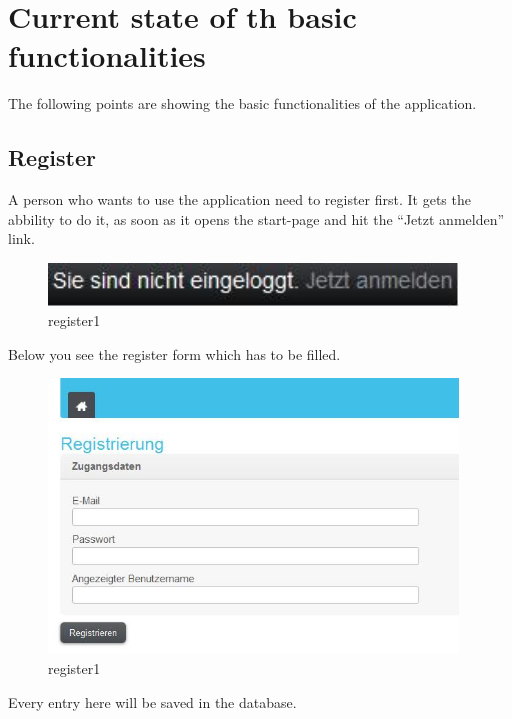 \section{Current state of th basic functionalities}

The following points are showing the basic functionalities of the application.

\subsection{Register}

A person who wants to use the application need to register first. It gets the abbility to do it, as soon as it opens the 
start-page and hit the \enquote{Jetzt anmelden} link.

\begin{figure}[!ht]
  \centering
    \includegraphics[width=0.97\textwidth]{images/basic_functionalities/reg1.jpg}
  \caption{register1}
  \label{fig:register1}
\end{figure}

Below you see the register form which has to be filled.

\begin{figure}[!ht]
  \centering
    \includegraphics[width=0.97\textwidth]{images/basic_functionalities/register_form.jpg}
  \caption{register1}
  \label{fig:register1}
\end{figure}

Every entry here will be saved in the database.

